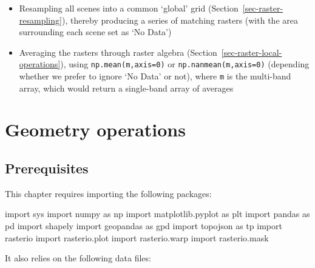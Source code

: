 \documentclass[
  letterpaper,
]{krantz}
\newenvironment{Shaded}{\begin{snugshade}}{\end{snugshade}}
\newcommand{\ImportTok}[1]{\textcolor[rgb]{0.00,0.46,0.62}{#1}}
\newcommand{\NormalTok}[1]{\textcolor[rgb]{0.00,0.23,0.31}{#1}}
\providecommand{\tightlist}{%
  \setlength{\itemsep}{0pt}\setlength{\parskip}{0pt}}\usepackage{longtable,booktabs,array}
\begin{document}
\begin{itemize}
\tightlist
\item
  Resampling all scenes into a common `global' grid
  (Section~\ref{sec-raster-resampling}), thereby producing a series of
  matching rasters (with the area surrounding each scene set as `No
  Data')
\item
  Averaging the rasters through raster algebra
  (Section~\ref{sec-raster-local-operations}), using
  \texttt{np.mean(m,axis=0)} or \texttt{np.nanmean(m,axis=0)} (depending
  whether we prefer to ignore `No Data' or not), where \texttt{m} is the
  multi-band array, which would return a single-band array of averages
\end{itemize}


\chapter{Geometry operations}\label{sec-geometric-operations}

\section*{Prerequisites}\label{prerequisites-3}


This chapter requires importing the following packages:

\begin{Shaded}
\begin{Highlighting}[]
\ImportTok{import}\NormalTok{ sys}
\ImportTok{import}\NormalTok{ numpy }\ImportTok{as}\NormalTok{ np}
\ImportTok{import}\NormalTok{ matplotlib.pyplot }\ImportTok{as}\NormalTok{ plt}
\ImportTok{import}\NormalTok{ pandas }\ImportTok{as}\NormalTok{ pd}
\ImportTok{import}\NormalTok{ shapely}
\ImportTok{import}\NormalTok{ geopandas }\ImportTok{as}\NormalTok{ gpd}
\ImportTok{import}\NormalTok{ topojson }\ImportTok{as}\NormalTok{ tp}
\ImportTok{import}\NormalTok{ rasterio}
\ImportTok{import}\NormalTok{ rasterio.plot}
\ImportTok{import}\NormalTok{ rasterio.warp}
\ImportTok{import}\NormalTok{ rasterio.mask}
\end{Highlighting}
\end{Shaded}

It also relies on the following data files:
\end{document}
